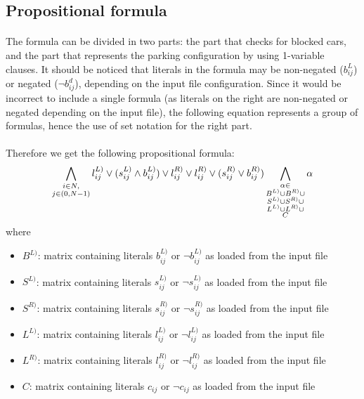 \subsection{Propositional formula}

\paragraph{}
The formula can be divided in two parts: the part that checks for blocked cars, and the part that represents the parking configuration by using 1-variable clauses. It should be noticed that literals in the formula may be non-negated ($b^L_{ij}$) or negated ($\neg b^d_{ij}$), depending on the input file configuration. Since it would be incorrect to include a single formula (as literals on the right are non-negated or negated depending on the input file), the following equation represents a group of formulas, hence the use of set notation for the right part.

\paragraph{}
Therefore we get the following propositional formula:
\begin{equation}
  \bigwedge_{\substack{i \in N,\\ j \in (0, N-1)}}l^{L)}_{ij} \lor (s^{L)}_{ij} \land b^{L)}_{ij}) \lor l^{R)}_{ij} \lor l^{R)}_{ij} \lor (s^{R)}_{ij} \lor b^{R)}_{ij})
  \bigwedge_{\substack{
      \alpha \in\\
      B^{L)} \cup
      B^{R)} \cup \\
      S^{L)} \cup
      S^{R)} \cup \\
      L^{L)} \cup
      L^{R)} \cup \\
      C
    }}
    \alpha
\end{equation}
where
\begin{itemize}
  \item $B^{L)}$: matrix containing literals $b^{L)}_{ij}$ or $\neg b^{L)}_{ij}$ as loaded from the input file
  \item $S^{L)}$: matrix containing literals $s^{L)}_{ij}$ or $\neg s^{L)}_{ij}$ as loaded from the input file
  \item $S^{R)}$: matrix containing literals $s^{R)}_{ij}$ or $\neg s^{R)}_{ij}$ as loaded from the input file
  \item $L^{L)}$: matrix containing literals $l^{L)}_{ij}$ or $\neg l^{L)}_{ij}$ as loaded from the input file
  \item $L^{R)}$: matrix containing literals $l^{R)}_{ij}$ or $\neg l^{R)}_{ij}$ as loaded from the input file
  \item $C$: matrix containing literals $c_{ij}$ or $\neg c_{ij}$ as loaded from the input file
\end{itemize}

